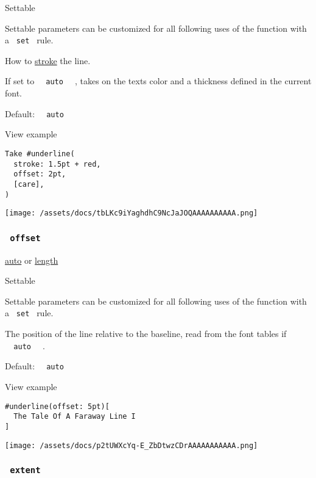 {{ Settable }}

\label{parameters-stroke-settable-tooltip}
Settable parameters can be customized for all following uses of the
function with a \texttt{\ set\ } rule.

How to \href{/docs/reference/visualize/stroke/}{stroke} the line.

If set to \texttt{\ }{\texttt{\ auto\ }}\texttt{\ } , takes on the
text\textquotesingle s color and a thickness defined in the current
font.

Default: \texttt{\ }{\texttt{\ auto\ }}\texttt{\ }


View example

\begin{verbatim}
Take #underline(
  stroke: 1.5pt + red,
  offset: 2pt,
  [care],
)
\end{verbatim}

\texttt{[image: /assets/docs/tbLKc9iYaghdhC9NcJaJOQAAAAAAAAAA.png]}

\subsubsection{\texorpdfstring{\texttt{\ offset\ }}{ offset }}\label{parameters-offset}

\href{/docs/reference/foundations/auto/}{auto} {or}
\href{/docs/reference/layout/length/}{length}

{{ Settable }}

\label{parameters-offset-settable-tooltip}
Settable parameters can be customized for all following uses of the
function with a \texttt{\ set\ } rule.

The position of the line relative to the baseline, read from the font
tables if \texttt{\ }{\texttt{\ auto\ }}\texttt{\ } .

Default: \texttt{\ }{\texttt{\ auto\ }}\texttt{\ }


View example

\begin{verbatim}
#underline(offset: 5pt)[
  The Tale Of A Faraway Line I
]
\end{verbatim}

\texttt{[image: /assets/docs/p2tUWXcYq-E\_ZbDtwzCDrAAAAAAAAAAA.png]}

\subsubsection{\texorpdfstring{\texttt{\ extent\ }}{ extent }}\label{parameters-extent}

